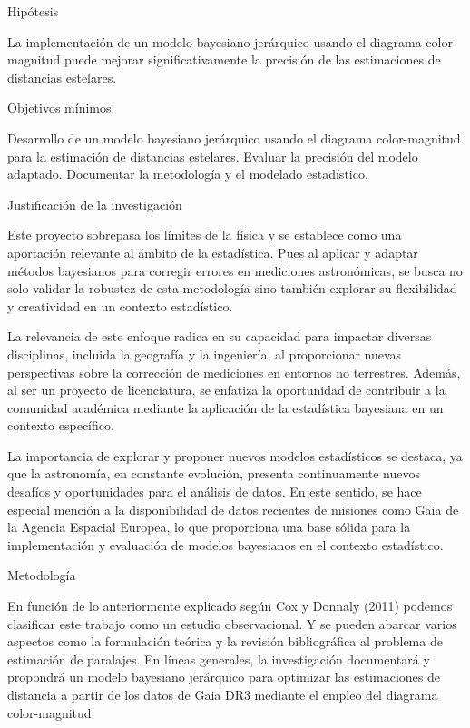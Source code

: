 \documentclass[stu, 12pt, letterpaper, donotrepeattitle, floatsintext, natbib]{apa7}
\begin{document}
Hipótesis

La implementación de un modelo bayesiano jerárquico usando el diagrama 
color-magnitud puede mejorar significativamente la precisión de las 
estimaciones de distancias estelares.

Objetivos mínimos.

Desarrollo de un modelo bayesiano jerárquico usando el diagrama color-magnitud para la estimación de distancias estelares.
Evaluar la precisión del modelo adaptado.
Documentar la metodología y el modelado estadístico.

Justificación de la investigación

Este proyecto sobrepasa los límites de la física y se establece como una 
aportación relevante al ámbito de la estadística. Pues al aplicar y adaptar 
métodos bayesianos para corregir errores en mediciones astronómicas, 
se busca no solo validar la robustez de esta metodología sino también 
explorar su flexibilidad y creatividad en un contexto estadístico.

La relevancia de este enfoque radica en su capacidad para impactar diversas 
disciplinas, incluida la geografía y la ingeniería, al proporcionar nuevas 
perspectivas sobre la corrección de mediciones en entornos no terrestres. 
Además, al ser un proyecto de licenciatura, se enfatiza la oportunidad de 
contribuir a la comunidad académica mediante la aplicación de la estadística 
bayesiana en un contexto específico.

La importancia de explorar y proponer nuevos modelos estadísticos se destaca, 
ya que la astronomía, en constante evolución, presenta continuamente nuevos 
desafíos y oportunidades para el análisis de datos. En este sentido, se hace 
especial mención a la disponibilidad de datos recientes de misiones como Gaia 
de la Agencia Espacial Europea, lo que proporciona una base sólida para la 
implementación y evaluación de modelos bayesianos en el contexto estadístico.

Metodología

En función de lo anteriormente explicado según Cox y Donnaly (2011) podemos 
clasificar este trabajo como un estudio observacional. Y se pueden abarcar 
varios aspectos como la formulación teórica y la revisión bibliográfica al 
problema de estimación de paralajes. En líneas generales, la investigación 
documentará y propondrá un modelo bayesiano jerárquico para optimizar las 
estimaciones de distancia a partir de los datos de Gaia DR3 mediante el 
empleo del diagrama color-magnitud.
\end{document}
